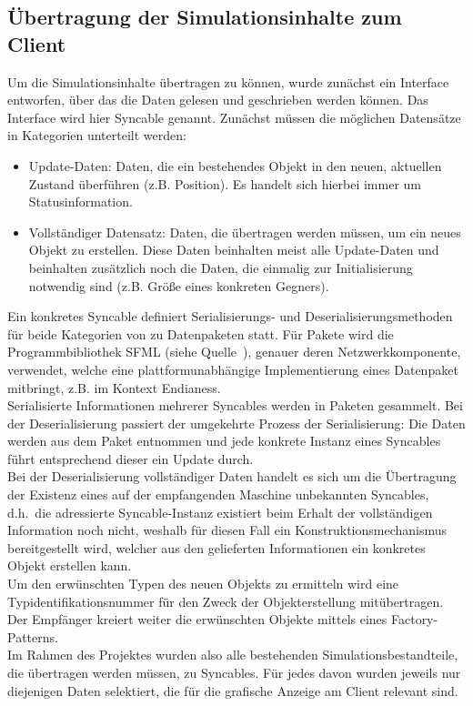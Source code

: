 \subsection{Übertragung der Simulationsinhalte zum Client}
\label{sec:syncable}
Um die Simulationsinhalte übertragen zu können, wurde zunächst ein Interface entworfen, über das die Daten gelesen und geschrieben werden können. Das Interface wird hier Syncable genannt.
Zunächst müssen die möglichen Datensätze in Kategorien unterteilt werden:
\begin{itemize}
\item Update-Daten: Daten, die ein bestehendes Objekt in den neuen, aktuellen Zustand überführen (z.B. Position). Es handelt sich hierbei immer um Statusinformation.
\item Vollständiger Datensatz: Daten, die übertragen werden müssen, um ein neues Objekt zu erstellen. Diese Daten beinhalten meist alle Update-Daten und beinhalten zusätzlich noch die Daten, die einmalig zur Initialisierung notwendig sind (z.B. Größe eines konkreten Gegners).
\end{itemize}
Ein konkretes Syncable definiert Serialisierungs- und Deserialisierungsmethoden für beide Kategorien von zu Datenpaketen statt. Für Pakete wird die Programmbibliothek SFML (siehe Quelle~\cite{sfml}), genauer deren Netzwerkkomponente, verwendet, welche eine plattformunabhängige Implementierung eines Datenpaket mitbringt, z.B. im Kontext Endianess.\\
Serialisierte Informationen mehrerer Syncables werden in Paketen gesammelt.
Bei der Deserialisierung passiert der umgekehrte Prozess der Serialisierung: Die Daten werden aus dem Paket entnommen und jede konkrete Instanz eines Syncables führt entsprechend dieser ein Update durch.\\
Bei der Deserialisierung vollständiger Daten handelt es sich um die Übertragung der Existenz eines auf der empfangenden Maschine unbekannten Syncables, d.h.~die adressierte Syncable-Instanz existiert beim Erhalt der vollständigen Information noch nicht, weshalb für diesen Fall ein Konstruktionsmechanismus bereitgestellt wird, welcher aus den gelieferten Informationen ein konkretes Objekt erstellen kann.\\
Um den erwünschten Typen des neuen Objekts zu ermitteln wird eine Typidentifikationsnummer für den Zweck der Objekterstellung mitübertragen.
Der Empfänger kreiert weiter die erwünschten Objekte mittels eines Factory-Patterns.\\
Im Rahmen des Projektes wurden also alle bestehenden Simulationsbestandteile, die übertragen werden müssen, zu Syncables. Für jedes davon wurden jeweils nur diejenigen Daten selektiert, die für die grafische Anzeige am Client relevant sind.\\

